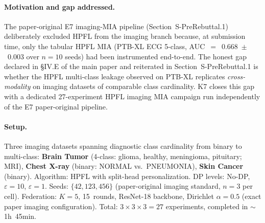 \documentclass[conference]{IEEEtran}
\begin{document}
\paragraph{Motivation and gap addressed.} The paper-original E7 imaging-MIA pipeline (Section~S-PreRebuttal.1) deliberately excluded HPFL from the imaging branch because, at submission time, only the tabular HPFL MIA (PTB-XL ECG 5-class, AUC~$=$~0.668~$\pm$~0.003 over $n{=}10$ seeds) had been instrumented end-to-end. The honest gap declared in §IV.E of the main paper and reiterated in Section~S-PreRebuttal.1 is whether the HPFL multi-class leakage observed on PTB-XL replicates \emph{cross-modality} on imaging datasets of comparable class cardinality. K7 closes this gap with a dedicated 27-experiment HPFL imaging MIA campaign run independently of the E7 paper-original pipeline.

\paragraph{Setup.} Three imaging datasets spanning diagnostic class cardinality from binary to multi-class: \textbf{Brain Tumor} (4-class: glioma, healthy, meningioma, pituitary; MRI), \textbf{Chest X-ray} (binary: NORMAL vs.\ PNEUMONIA), \textbf{Skin Cancer} (binary). Algorithm: HPFL with split-head personalization. DP levels: No-DP, $\varepsilon{=}10$, $\varepsilon{=}1$. Seeds: $\{42, 123, 456\}$ (paper-original imaging standard, $n{=}3$ per cell). Federation: $K{=}5$, 15~rounds, ResNet-18 backbone, Dirichlet $\alpha{=}0.5$ (exact paper imaging configuration). Total: $3 \times 3 \times 3 = 27$ experiments, completed in $\sim$1h~45min.
\end{document}
